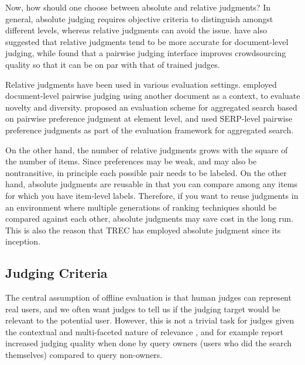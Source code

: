 Now, how should one choose between absolute and relative judgments? In general, absolute judging requires objective criteria to distinguish amongst different levels, whereas relative judgments can avoid the issue. \cite{CarteretteBCD08} have also suggested that relative judgments tend to be more accurate for document-level judging, while \cite{Kazai:2013} found that a pairwise judging interface improves crowdsourcing quality so that it can be on par with that of trained judges.

Relative judgments have been used in various evaluation settings. \cite{Chandar2013} employed document-level pairwise judging using another document as a context, to evaluate novelty and diversity. \cite{Arguello:2011} proposed an evaluation scheme for aggregated search based on pairwise preference judgment at element level, and \cite{Zhou:2012} used SERP-level pairwise preference judgments as part of the evaluation framework for aggregated search.

On the other hand, the number of relative judgments grows with the square of the number of items. Since preferences may be weak, and may also be nontransitive, in principle each possible pair needs to be labeled. \cite{CarteretteBCD08} On the other hand, absolute judgments are reusable in that you can compare among any items for which you have item-level labels. Therefore, if you want to reuse judgments in an environment where multiple generations of ranking techniques should be compared against each other, absolute judgments may save cost in the long run. This is also the reason that TREC has employed absolute judgment since its inception.\cite{}



\subsection{Judging Criteria}
The central assumption of offline evaluation is that human judges can represent real users, and we often want judges to tell us if the judging target would be relevant to the potential user.  However, this is not a trivial task for judges given the contextual and multi-faceted nature of relevance \citep{Borlund:2003}, and for example \cite{Chouldechova:2013} report increased judging quality when done by query owners (users who did the search themselves) compared to query non-owners.

